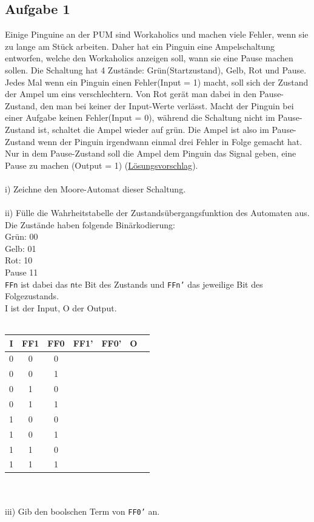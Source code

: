 \documentclass{article}
\begin{document}
\subsection{Aufgabe 1}
Einige Pinguine an der PUM sind Workaholics und machen viele Fehler, wenn sie zu lange am Stück arbeiten. Daher hat ein Pinguin eine Ampelschaltung  entworfen, welche den Workaholics anzeigen soll, wann sie eine Pause machen sollen. Die Schaltung hat 4 Zustände: Grün(Startzustand), Gelb, Rot und Pause. Jedes Mal wenn ein Pinguin einen Fehler(Input = 1) macht, soll sich der Zustand der Ampel um eins verschlechtern. Von Rot gerät man dabei in den Pause-Zustand, den man bei keiner der Input-Werte verlässt. Macht der Pinguin bei einer Aufgabe keinen Fehler(Input = 0), während die Schaltung nicht im Pause-Zustand ist, schaltet die Ampel wieder auf grün. Die Ampel ist also im Pause-Zustand wenn der Pinguin irgendwann einmal drei Fehler in Folge gemacht hat. Nur in dem Pause-Zustand soll die Ampel dem Pinguin das Signal geben, eine Pause zu machen (Output = 1)
(\hyperref[sec:lsg01]{Lösungsvorschlag}). \\
\\
i) Zeichne den Moore-Automat dieser Schaltung.\\
\\
ii) Fülle die Wahrheitstabelle der Zustandsübergangsfunktion des Automaten aus. Die Zustände haben folgende Binärkodierung: \\
Grün: 00 \\
Gelb: 01 \\
Rot: 10 \\
Pause 11 \\
\texttt{FFn} ist dabei das \texttt{n}te Bit des Zustands und \texttt{FFn'} das jeweilige Bit des Folgezustands.\\
I ist der Input, O der Output.\\ 
\\
\begin{tabular}{c|c|c|c|c|c|c}
   I  & FF1 & FF0 & FF1' & FF0' & O \\
    \hline
   0   &  0   & 0   &      &      &   \\
    \hline
   0  &   0  &  1   &      &      &   \\
     \hline
   0  &  1   &  0   &      &      &   \\
     \hline
   0  &   1  &  1   &      &      &   \\
     \hline
   1  &  0   &  0   &      &      &   \\
     \hline
   1  &   0  &  1   &      &      &   \\
     \hline
   1  &  1   &  0   &      &      &   \\
     \hline
   1  &  1   &   1  &      &      &   \\
     \hline
\end{tabular} \\
\\
iii) Gib den boolschen Term von \texttt{FF0'} an.
\end{document}
